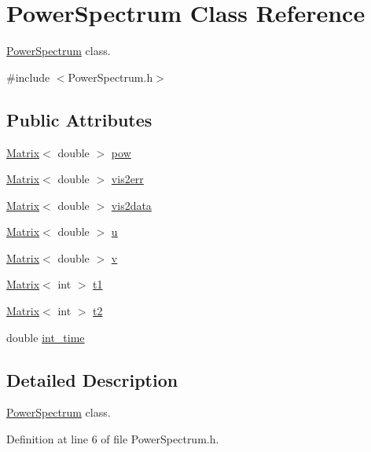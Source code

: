\hypertarget{classPowerSpectrum}{
\section{PowerSpectrum Class Reference}
\label{classPowerSpectrum}
}


\hyperlink{classPowerSpectrum}{PowerSpectrum} class.  




{\ttfamily \#include $<$PowerSpectrum.h$>$}

\subsection*{Public Attributes}
\begin{DoxyCompactItemize}
\item 
\hyperlink{classMatrix}{Matrix}$<$ double $>$ \hyperlink{classPowerSpectrum_a20298a01053cfb3aa197d4bc57526bff}{pow}
\item 
\hyperlink{classMatrix}{Matrix}$<$ double $>$ \hyperlink{classPowerSpectrum_a68e8c6a4fa15893a796f233e35b9886a}{vis2err}
\item 
\hyperlink{classMatrix}{Matrix}$<$ double $>$ \hyperlink{classPowerSpectrum_a98e7a9d427be82f83bc9e925d8a44d71}{vis2data}
\item 
\hyperlink{classMatrix}{Matrix}$<$ double $>$ \hyperlink{classPowerSpectrum_a42e71945396d45b5603b5ea1f4933a6a}{u}
\item 
\hyperlink{classMatrix}{Matrix}$<$ double $>$ \hyperlink{classPowerSpectrum_a48e7c06920fc8baaa690a7fcf71284d7}{v}
\item 
\hyperlink{classMatrix}{Matrix}$<$ int $>$ \hyperlink{classPowerSpectrum_a63136c308d576020a0611fef55e7165b}{t1}
\item 
\hyperlink{classMatrix}{Matrix}$<$ int $>$ \hyperlink{classPowerSpectrum_a449e5f435037ff6354d2decaa1345f81}{t2}
\item 
double \hyperlink{classPowerSpectrum_a7d07ae6e17c08448bc5ae8a79fc36a95}{int\_\-time}
\end{DoxyCompactItemize}


\subsection{Detailed Description}
\hyperlink{classPowerSpectrum}{PowerSpectrum} class. 

Definition at line 6 of file PowerSpectrum.h.



